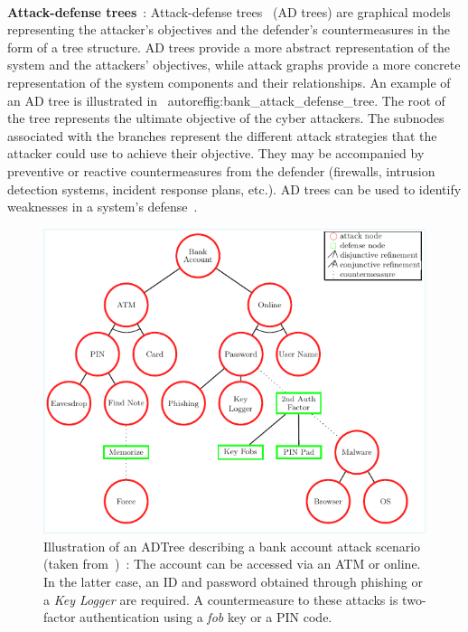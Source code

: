 \

\noindent
\textbf{Attack-defense trees}~: \quad Attack-defense trees~\cite{BKordy2010} (AD trees) are graphical models representing the attacker's objectives and the defender's countermeasures in the form of a tree structure. AD trees provide a more abstract representation of the system and the attackers' objectives, while attack graphs provide a more concrete representation of the system components and their relationships. An example of an AD tree is illustrated in \ autoref{fig:bank_attack_defense_tree}. The root of the  tree represents the ultimate objective of the cyber attackers. The subnodes associated with the branches represent the different attack strategies that the attacker could use to achieve their objective. They may be accompanied by preventive or reactive countermeasures from the defender (firewalls, intrusion detection systems, incident response plans, etc.).
AD trees can be used to identify weaknesses in a system's defense~\cite{BKordy2010}.

\begin{figure}[h!]
  \centering
  \includegraphics[width=\linewidth]{figures/adt.pdf}
  \caption[Illustration of an ADTree for a bank account attack scenario (taken from~\cite{BKordy2010})]{Illustration of an ADTree describing a bank account attack scenario (taken from~\cite{BKordy2010})~: The account can be accessed via an ATM or online. In the latter case, an ID and password obtained through phishing or a \textit{Key Logger} are required. A countermeasure to these attacks is two-factor authentication using a \textit{fob} key or a PIN code.}
  \label{fig:bank_attack_defense_tree}
\end{figure}

